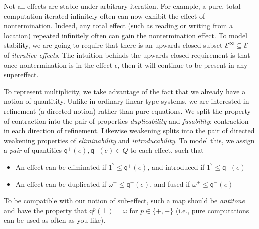 \documentclass[acmsmall,screen,review]{acmart}
\newcommand{\mc}[1]{\ensuremath{\mathcal{#1}}}
\newcommand{\ms}[1]{\ensuremath{\mathsf{#1}}}
\newcommand{\delq}{1^?}
\newcommand{\cpyq}{\omega^+}
\newcommand{\topq}{\omega}
\newcommand{\alquant}{\ms{q}}
\begin{document}
Not all effects are stable under arbitrary iteration. For example, a pure, total computation
iterated infinitely often can now exhibit the effect of nontermination. Indeed, any total effect
(such as reading or writing from a location) repeated infinitely often can gain the nontermination
effect. To model stability, we are going to require that there is an upwards-closed subset
$\mc{E}^\infty \subseteq \mc{E}$ of \emph{iterative effects}. The intuition behinds the
upwards-closed requirement is that once nontermination is in the effect $\epsilon$, then it will
continue to be present in any supereffect.

To represent multiplicity, we take advantage of the fact that we already
have a notion of quantitity.  Unlike in ordinary linear type
systems, we are interested in refinement (a directed notion) rather than pure equations.  We
split the property of contraction into the pair of properties
\emph{duplicability} and \emph{fusability}: contraction in each direction of refinement. Likewise
weakening splits into the pair of directed weakening properties of \emph{eliminability} and
\emph{introducability}. To model this, we assign a \emph{pair} of quantities $\alquant^+(e),
\alquant^-(e) \in Q$ to each effect, such that
\begin{itemize}
  \item An effect can be eliminated if $\delq \leq \alquant^+(e)$, and introduced if $\delq \leq
  \alquant^-(e)$
  \item An effect can be duplicated if $\cpyq \leq \alquant^+(e)$, and fused if $\cpyq \leq
  \alquant^-(e)$
\end{itemize}
To be compatible with our notion of sub-effect, such a map should be \emph{antitone} and have
the property that $\alquant^p(\bot) = \topq$ for $p \in \{+, -\}$ (i.e., pure computations can
be used as often as you like).
\end{document}
